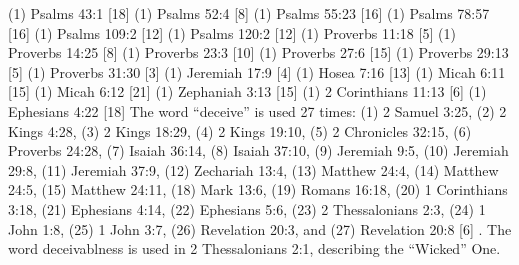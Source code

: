 (1) Psalms 43:1 [18]
(1) Psalms 52:4 [8]
(1) Psalms 55:23 [16]
(1) Psalms 78:57 [16]
(1) Psalms 109:2 [12]
(1) Psalms 120:2 [12]
(1) Proverbs 11:18 [5]
(1) Proverbs 14:25 [8]
(1) Proverbs 23:3 [10]
(1) Proverbs 27:6 [15]
(1) Proverbs 29:13 [5]
(1) Proverbs 31:30 [3]
(1) Jeremiah 17:9 [4]
(1) Hosea 7:16 [13]
(1) Micah 6:11 [15]
(1) Micah 6:12 [21]
(1) Zephaniah 3:13 [15]
(1) 2 Corinthians 11:13 [6]
(1) Ephesians 4:22 [18]
The word ``deceive'' is used 27 times: (1) 2 Samuel 3:25, (2) 2 Kings 4:28, (3) 2 Kings 18:29, (4) 2 Kings 19:10, (5) 2 Chronicles 32:15, (6) Proverbs 24:28, (7) Isaiah 36:14, (8) Isaiah 37:10, (9) Jeremiah 9:5, (10) Jeremiah 29:8, (11) Jeremiah 37:9, (12) Zechariah 13:4, (13) Matthew 24:4, (14) Matthew 24:5, (15) Matthew 24:11,  (18) Mark 13:6, (19) Romans 16:18, (20) 1 Corinthians 3:18, (21) Ephesians 4:14, (22) Ephesians 5:6, (23) 2 Thessalonians 2:3, (24) 1 John 1:8, (25) 1 John 3:7, (26) Revelation 20:3, and (27) Revelation 20:8 [6]
. The word deceivablness is used in 2 Thessalonians 2:1, describing the ``Wicked'' One.